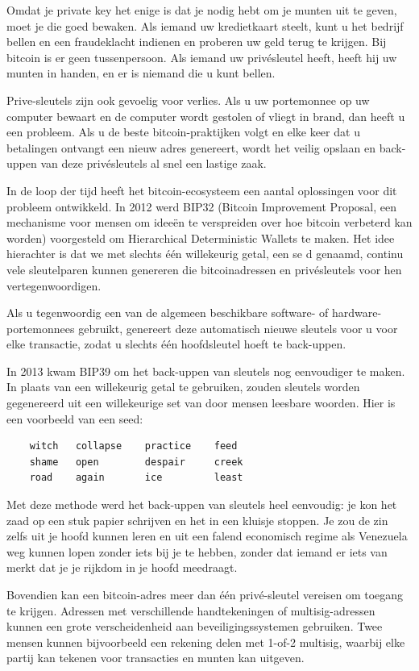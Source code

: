 \documentclass[smalldemyvopaper,11pt,twoside,onecolumn,openright,extrafontsizes]{memoir}
\begin{document}
Omdat je private key het enige is dat je nodig hebt om je munten uit te geven, moet je die goed bewaken. Als iemand uw kredietkaart steelt, kunt u het bedrijf bellen en een fraudeklacht indienen en proberen uw geld terug te krijgen. Bij bitcoin is er geen tussenpersoon. Als iemand uw privésleutel heeft, heeft hij uw munten in handen, en er is niemand die u kunt bellen. 

Prive-sleutels zijn ook gevoelig voor verlies. Als u uw portemonnee op uw computer bewaart en de computer wordt gestolen of vliegt in brand, dan heeft u een probleem. Als u de beste bitcoin-praktijken volgt en elke keer dat u betalingen ontvangt een nieuw adres genereert, wordt het veilig opslaan en back-uppen van deze privésleutels al snel een lastige zaak. 

In de loop der tijd heeft het bitcoin-ecosysteem een aantal oplossingen voor dit probleem ontwikkeld. In 2012 werd BIP32 (Bitcoin Improvement Proposal, een mechanisme voor mensen om ideeën te verspreiden over hoe bitcoin verbeterd kan worden) voorgesteld om Hierarchical Deterministic Wallets te maken. Het idee hierachter is dat we met slechts één willekeurig getal, een se d genaamd, continu vele sleutelparen kunnen genereren die bitcoinadressen en privésleutels voor hen vertegenwoordigen. 

Als u tegenwoordig een van de algemeen beschikbare software- of hardware-portemonnees gebruikt, genereert deze automatisch nieuwe sleutels voor u voor elke transactie, zodat u slechts één hoofdsleutel hoeft te back-uppen. 

In 2013 kwam BIP39 om het back-uppen van sleutels nog eenvoudiger te maken. In plaats van een willekeurig getal te gebruiken, zouden sleutels worden gegenereerd uit een willekeurige set van door mensen leesbare woorden. Hier is een voorbeeld van een seed:

\begin{verbatim}
    witch   collapse    practice    feed
    shame   open        despair     creek
    road    again       ice         least
\end{verbatim}

Met deze methode werd het back-uppen van sleutels heel eenvoudig: je kon het zaad op een stuk papier schrijven en het in een kluisje stoppen. Je zou de zin zelfs uit je hoofd kunnen leren en uit een falend economisch regime als Venezuela weg kunnen lopen zonder iets bij je te hebben, zonder dat iemand er iets van merkt dat je je rijkdom in je hoofd meedraagt. 

Bovendien kan een bitcoin-adres meer dan één privé-sleutel vereisen om toegang te krijgen. Adressen met verschillende handtekeningen of multisig-adressen kunnen een grote verscheidenheid aan beveiligingssystemen gebruiken. Twee mensen kunnen bijvoorbeeld een rekening delen met 1-of-2 multisig, waarbij elke partij kan tekenen voor transacties en munten kan uitgeven. 
\end{document}
